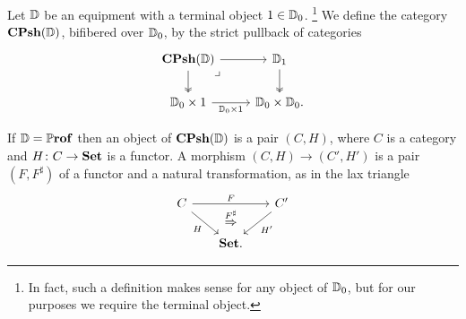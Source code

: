 \documentclass[11pt,oneside,article]{memoir}
\begin{document}
\begin{definition}
      \label{def:copresheaves}
   Let $\mathbb{D}$ be an equipment with a terminal object $1\in\mathbb{D}_0$.%
   \footnote{In fact, such a definition makes sense for any object of $\mathbb{D}_0$, but for our
   purposes we require the terminal object.}
   We define the category $\mathbf{CPsh}(\mathbb{D})$, bifibered over
   $\mathbb{D}_0$, by the strict pullback of categories
   \begin{equation*}
     \begin{tikzcd}
         \CPsh(\dcat{D}) \ar[r] \ar[d,two heads] \arrow[dr,phantom,"\lrcorner",very near start]
            & \dcat{D}_1 \ar[d,two heads] \\
         \dcat{D}_0\times 1 \ar[r,"\dcat{D}_0\times 1"']
            & \dcat{D}_0\times\dcat{D}_0.
      \end{tikzcd}
   \end{equation*}
\end{definition}

\begin{example}
If $\mathbb{D}=\mathbb{P}\mathbf{rof}$ then an object of $\mathbf{CPsh}(\mathbb{D})$ is a pair $(C,H)$, where $C$ is a category
and $H\colon C\to\mathbf{Set}$ is a functor. A morphism $(C,H)\to(C',H')$ is a pair $(F,F^\sharp)$ of a
functor and a natural transformation, as in the lax triangle
\[ \begin{tikzcd}[column sep=.6cm]
   C\ar[rr,"F"]\ar[rd,"H"']&\ar[d,phantom,"\overset{F^\sharp}{\Rightarrow}" near start]&C'\ar[dl,"H'"]\\
   &\Set.
\end{tikzcd} \]
\end{example}
\end{document}
